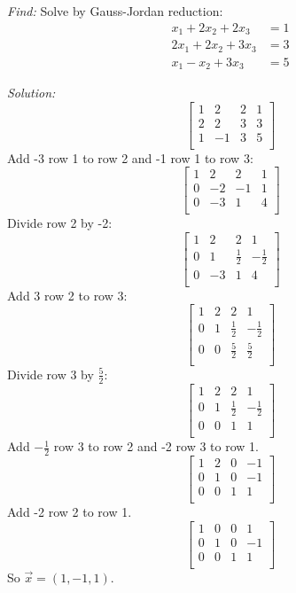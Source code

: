 \documentclass[11pt]{homework}
\begin{document}
\maketitle

\question
\emph{Find:}
\newline
Solve by Gauss-Jordan reduction:
\begin{align*}
x_1 + 2 x_2 + 2 x_3 &= 1 \\
2 x_1 + 2 x_2 + 3 x_3 &= 3 \\
x_1 - x_2 + 3 x_3 &= 5 
\end{align*}

\noindent
\emph{Solution:}
\newline
\[
\left[
  \begin{array}{ccc|c}
  1 & 2 & 2 & 1  \\
  2 & 2 & 3 & 3 \\
  1 & -1 & 3 & 5 \\
  \end{array}
\right]
\]
Add -3 row 1 to row 2 and -1 row 1 to row 3:
\[
\left[
  \begin{array}{ccc|c}
  1 & 2 & 2 & 1  \\
  0 & -2 & -1 & 1 \\
  0 & -3 & 1 & 4 \\
  \end{array}
\right]
\]
Divide row 2 by -2:
\[
\left[
  \begin{array}{ccc|c}
  1 & 2 & 2 & 1  \\
  0 & 1 & \frac{1}{2} & -\frac{1}{2} \\
  0 & -3 & 1 & 4 \\
  \end{array}
\right]
\]
Add 3 row 2 to row 3:
\[
\left[
  \begin{array}{ccc|c}
  1 & 2 & 2 & 1  \\
  0 & 1 & \frac{1}{2} & -\frac{1}{2} \\
  0 & 0 & \frac{5}{2} & \frac{5}{2} \\
  \end{array}
\right]
\]
Divide row 3 by $\frac{5}{2}$:
\[
\left[
  \begin{array}{ccc|c}
  1 & 2 & 2 & 1  \\
  0 & 1 & \frac{1}{2} & -\frac{1}{2} \\
  0 & 0 & 1 & 1 \\
  \end{array}
\right]
\]
Add $-\frac{1}{2}$ row 3 to row 2 and -2 row 3 to row 1.
\[
\left[
  \begin{array}{ccc|c}
  1 & 2 & 0 & -1  \\
  0 & 1 & 0 & -1 \\
  0 & 0 & 1 & 1 \\
  \end{array}
\right]
\]
Add -2 row 2 to row 1.
\[
\left[
  \begin{array}{ccc|c}
  1 & 0 & 0 & 1  \\
  0 & 1 & 0 & -1 \\
  0 & 0 & 1 & 1 \\
  \end{array}
\right]
\]
So $\vec x=( 1, -1, 1)$.
\end{document}
